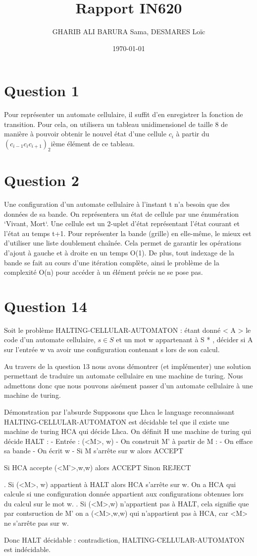 \documentclass{article}
\title{Rapport IN620}
\date{\today}
\author{GHARIB ALI BARURA Sama, DESMARES Loïc}
\begin{document}
  \maketitle

  \newpage

  \section{Question 1}
    Pour représenter un automate cellulaire, il suffit d'en enregistrer la fonction de
  transition. Pour cela, on utilisera un tableau unidimensionel de taille 8 de manière
  à pouvoir obtenir le nouvel état d'une cellule \(c_i\) à partir du
  \((c_{i-1} c_i c_{i+1})_2\)ième élément de ce tableau.

  \section{Question 2}
      Une configuration d'un automate cellulaire à l'instant t n'a besoin que des données
  de sa bande. On représentera un état de cellule par une énumération `Vivant, Mort`.
  Une cellule est un 2-uplet d'état représentant l'état courant et l'état au temps t+1.
  Pour représenter la bande (grille) en elle-même, le mieux est d'utiliser une liste doublement
  chaînée. Cela permet de garantir les opérations d'ajout à gauche et à droite en un temps
  O(1). De plus, tout indexage de la bande se fait au cours d'une itération complète, ainsi
  le problème de la complexité O(n) pour accéder à un élément précis ne se pose pas.

  \section{Question 14}
      Soit le problème HALTING-CELLULAR-AUTOMATON : étant donné < A > le code
  d’un automate cellulaire, $s \in S$ et un mot w appartenant à S * , décider si A sur l’entrée w va avoir une configuration
  contenant s lors de son calcul.

  Au travers de la question 13 nous avons démontrer (et implémenter) une solution permettant de traduire un 
  automate cellulaire en une machine de turing.
  Nous admettons donc que nous pouvons aisément passer d'un automate cellulaire à une machine de turing.

  Démonstration par l'absurde
  Supposons que Lhca le language reconnaissant HALTING-CELLULAR-AUTOMATON est décidable tel que il existe 
  une machine de turing HCA qui décide Lhca.
  On définit H une machine de turing qui décide HALT :
  - Entrée : (<M>, w)
  - On construit M' à partir de M :
    - On efface sa bande
    - On écrit w
    - Si M s'arrête sur w alors ACCEPT

  Si HCA accepte (<M'>,w,w) alors ACCEPT
    Sinon REJECT

  . Si (<M>, w) appartient à HALT alors HCA s'arrête sur w. On a HCA qui calcule si une configuration donnée 
  appartient aux configurations obtenues lors du calcul sur le mot w.
  . Si (<M>,w) n'appartient pas à HALT, cela signifie que par contsruction de M' on a (<M>,w,w) qui n'appartient pas à HCA, car <M> ne s'arrête pas sur w.

  Donc HALT décidable : contradiction, HALTING-CELLULAR-AUTOMATON est indécidable.
  
\end{document}
